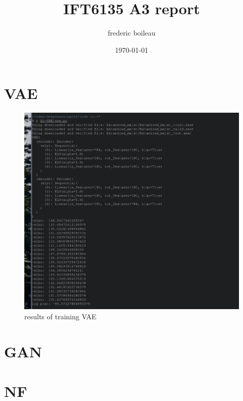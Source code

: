 \documentclass[11pt]{article}
\author{frederic boileau}
\date{\today}
\title{IFT6135 A3 report}
\begin{document}
\maketitle

\section*{VAE}
\label{sec:orgeb4da56}
\begin{figure}[!htpb]
\centering
\includegraphics[width=.9\linewidth]{./elboandll.png}
\caption{results of training VAE}
\end{figure}

\section*{GAN}
\label{sec:orgf5d3057}

\section*{NF}
\label{sec:orgd571b90}
\end{document}
